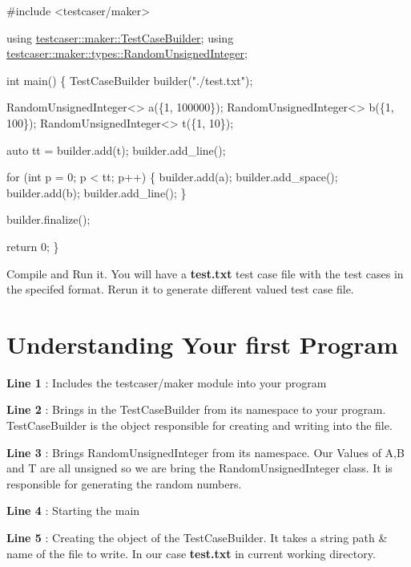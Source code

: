 \begin{DoxyCode}
\textcolor{preprocessor}{#include <testcaser/maker>}

\textcolor{keyword}{using} \hyperlink{classtestcaser_1_1maker_1_1TestCaseBuilder}{testcaser::maker::TestCaseBuilder};
\textcolor{keyword}{using} \hyperlink{classtestcaser_1_1maker_1_1types_1_1RandomUnsignedInteger}{testcaser::maker::types::RandomUnsignedInteger};

\textcolor{keywordtype}{int} main() \{
TestCaseBuilder builder(\textcolor{stringliteral}{"./test.txt"});

RandomUnsignedInteger<> a(\{1, 100000\});
RandomUnsignedInteger<> b(\{1, 100\});
RandomUnsignedInteger<> t(\{1, 10\});

\textcolor{keyword}{auto} tt = builder.add(t);
builder.add\_line();

\textcolor{keywordflow}{for} (\textcolor{keywordtype}{int} p = 0; p < tt; p++) \{
  builder.add(a);
  builder.add\_space();
  builder.add(b);
  builder.add\_line();
\}

builder.finalize();

\textcolor{keywordflow}{return} 0;
\}
\end{DoxyCode}


Compile and Run it. You will have a {\bfseries test.\+txt} test case file with the test cases in the specifed format. Rerun it to generate different valued test case file.\hypertarget{index_under_standing}{}\section{Understanding Your first Program}\label{index_under_standing}
{\bfseries Line 1} \+: Includes the testcaser/maker module into your program

{\bfseries Line 2} \+: Brings in the Test\+Case\+Builder from its namespace to your program. Test\+Case\+Builder is the object responsible for creating and writing into the file.

{\bfseries Line 3} \+: Brings Random\+Unsigned\+Integer from its namespace. Our Values of A,B and T are all unsigned so we are bring the Random\+Unsigned\+Integer class. It is responsible for generating the random numbers.

{\bfseries Line 4 } \+: Starting the main

{\bfseries Line 5 } \+: Creating the object of the Test\+Case\+Builder. It takes a string path \& name of the file to write. In our case {\bfseries test.\+txt} in current working directory.

